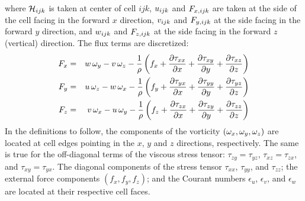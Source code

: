 where ${\cal H}_{ijk}$ is taken at center of cell $ijk$,
$u_{ijk}$ and $F_{x,ijk}$ are taken at the side of the cell facing
in the forward $x$ direction, $v_{ijk}$ and $F_{y,ijk}$ at the side
facing in the forward $y$ direction, and $w_{ijk}$ and $F_{z,ijk}$
at the side facing in the forward $z$ (vertical) direction.
The flux terms are discretized:
\begin{eqnarray}
F_x &=& w \, \omega_y - v \, \omega_z - \frac{1}{\rho} \left( f_x
  +  \frac{\partial \tau_{xx}}{\partial x} + \frac{\partial \tau_{xy}}{\partial y} + \frac{\partial \tau_{xz}}{\partial z} \right) \\
F_y &=& u \, \omega_z - w \, \omega_x - \frac{1}{\rho} \left( f_y
  +  \frac{\partial \tau_{yx}}{\partial x} + \frac{\partial \tau_{yy}}{\partial y} + \frac{\partial \tau_{yz}}{\partial z} \right) \\
F_z &=& v \, \omega_x - u \, \omega_y - \frac{1}{\rho} \left( f_z
  +  \frac{\partial \tau_{zx}}{\partial x} + \frac{\partial \tau_{zy}}{\partial y} + \frac{\partial \tau_{zz}}{\partial z} \right)
\end{eqnarray}
In the
definitions to follow, the components of the vorticity $(\omega_x,\omega_y,\omega_z)$
are located at cell edges pointing in the $x$, $y$ and $z$ directions,
respectively. The same is true for the off-diagonal terms of the viscous
stress tensor: $\tau_{zy}=\tau_{yz}$, $\tau_{xz}=\tau_{zx}$, and
$\tau_{xy}=\tau_{yx}$. The diagonal components of the stress
tensor $\tau_{xx}$, $\tau_{yy}$, and $\tau_{zz}$; the external force
components $(f_x,f_y,f_z)$; and the Courant numbers
$\epsilon_u$, $\epsilon_v$, and $\epsilon_w$ are located at their
respective cell faces.
